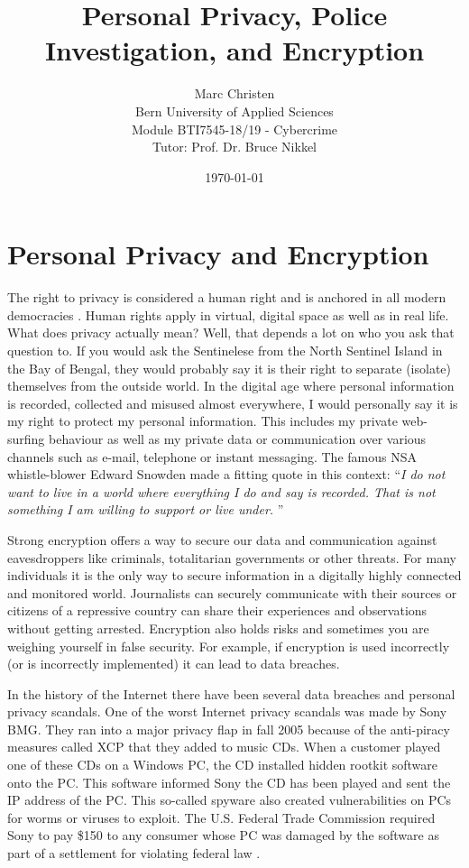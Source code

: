 \documentclass[a4paper, 11pt]{article}
\title{Personal Privacy, Police Investigation, and Encryption}
\author{Marc Christen  \\
	Bern University of Applied Sciences \\
	Module BTI7545-18/19 - Cybercrime \\
	Tutor: Prof. Dr. Bruce Nikkel \\
}
\date{\today}
\begin{document}
\maketitle
\noindent
\section*{Personal Privacy and Encryption}
The right to privacy is considered a human right and is anchored in all modern democracies \cite{ECHR}. Human rights apply in virtual, digital space as well as in real life. What does privacy actually mean? Well, that depends a lot on who you ask that question to. If you would ask the Sentinelese from the North Sentinel Island in the Bay of Bengal, they would probably say it is their right to separate (isolate) themselves from the outside world. In the digital age where personal information is recorded, collected and misused almost everywhere, I would personally say it is my right to protect my personal information. This includes my private web-surfing behaviour as well as my private data or communication over various channels such as e-mail, telephone or instant messaging. The famous NSA whistle-blower Edward Snowden made a fitting quote in this context: \enquote{\textit{I do not want to live in a world where everything I do and say is recorded. That is not something I am willing to support or live under.} \cite{SNOWDEN}}  
\par Strong encryption offers a way to secure our data and communication against eavesdroppers like criminals, totalitarian governments or other threats.
For many individuals it is the only way to secure information in a digitally highly connected and monitored world. Journalists can securely communicate with their sources or citizens of a repressive country can share their experiences and observations without getting arrested.
Encryption also holds risks and sometimes you are weighing yourself in false security. For example, if encryption is used incorrectly (or is incorrectly implemented) it can lead to data breaches.
\par In the history of the Internet there have been several data breaches and personal privacy scandals. One of the worst Internet privacy scandals was made by Sony BMG. They ran into a major privacy flap in fall 2005 because of the anti-piracy measures called XCP that they added to music CDs. When a customer played one of these CDs on a Windows PC, the CD installed hidden rootkit software onto the PC. This software informed Sony the CD has been played and sent the IP address of the PC. This so-called spyware also created vulnerabilities on PCs for worms or viruses to exploit. The U.S. Federal Trade Commission required Sony to pay \$150 to any consumer whose PC was damaged by the software as part of a settlement for violating federal law \cite{SONY}.
\end{document}
